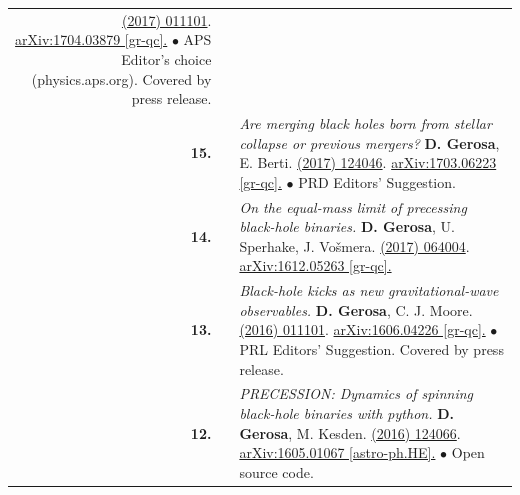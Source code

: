 {\begin{longtable}{rp{0.3cm}p{15.8cm}}
\href{http://dx.doi.org/10.1103/PhysRevLett.119.011101}{\prl 119 (2017) 011101}. \href{https://arxiv.org/abs/1704.03879}{arXiv:1704.03879 [gr-qc].}
\newline{}
\textcolor{color1}{$\bullet$} APS Editor's choice (physics.aps.org). Covered by press release.
\vspace{0.09cm}\\
%
\textbf{15.} & & \textit{Are merging black holes born from stellar collapse or previous mergers?}
\newline{}
\textbf{D. Gerosa}, E. Berti.
\newline{}
\href{http://dx.doi.org/10.1103/PhysRevD.95.124046}{\prd 95 (2017) 124046}. \href{https://arxiv.org/abs/1703.06223}{arXiv:1703.06223 [gr-qc].}
\newline{}
\textcolor{color1}{$\bullet$} PRD Editors' Suggestion.
\vspace{0.09cm}\\
%
\textbf{14.} & & \textit{On the equal-mass limit of precessing black-hole binaries.}
\newline{}
\textbf{D. Gerosa}, U. Sperhake, J. Vo\v{s}mera.
\newline{}
\href{http://dx.doi.org/10.1088/1361-6382/aa5e58}{\cqg 34 (2017) 064004}. \href{https://arxiv.org/abs/1612.05263}{arXiv:1612.05263 [gr-qc].}
\vspace{0.09cm}\\
%
\textbf{13.} & & \textit{Black-hole kicks as new gravitational-wave observables.}
\newline{}
\textbf{D. Gerosa}, C. J. Moore.
\newline{}
\href{http://dx.doi.org/10.1103/PhysRevLett.117.011101}{\prl 117 (2016) 011101}. \href{https://arxiv.org/abs/1606.04226}{arXiv:1606.04226 [gr-qc].}
\newline{}
\textcolor{color1}{$\bullet$} PRL Editors' Suggestion. Covered by press release.
\vspace{0.09cm}\\
%
\textbf{12.} & & \textit{PRECESSION: Dynamics of spinning black-hole binaries with python.}
\newline{}
\textbf{D. Gerosa}, M. Kesden.
\newline{}
\href{http://dx.doi.org/10.1103/PhysRevD.93.124066}{\prd 93 (2016) 124066}. \href{https://arxiv.org/abs/1605.01067}{arXiv:1605.01067 [astro-ph.HE].}
\newline{}
\textcolor{color1}{$\bullet$} Open source code.
\vspace{0.09cm}\\

\end{longtable}}
